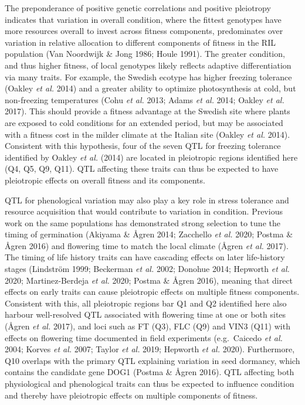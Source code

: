 \documentclass[
]{article}
\begin{document}
The preponderance of positive genetic correlations and positive pleiotropy indicates that variation in overall condition, where the fittest genotypes have more resources overall to invest across fitness components, predominates over variation in relative allocation to different components of fitness in the RIL population (Van Noordwijk \& Jong 1986; Houle 1991). The greater condition, and thus higher fitness, of local genotypes likely reflects adaptive differentiation via many traits. For example, the Swedish ecotype has higher freezing tolerance (Oakley \emph{et al.} 2014) and a greater ability to optimize photosynthesis at cold, but non-freezing temperatures (Cohu \emph{et al.} 2013; Adams \emph{et al.} 2014; Oakley \emph{et al.} 2017). This should provide a fitness advantage at the Swedish site where plants are exposed to cold conditions for an extended period, but may be associated with a fitness cost in the milder climate at the Italian site (Oakley \emph{et al.} 2014). Consistent with this hypothesis, four of the seven QTL for freezing tolerance identified by Oakley \emph{et al.} (2014) are located in pleiotropic regions identified here (Q4, Q5, Q9, Q11). QTL affecting these traits can thus be expected to have pleiotropic effects on overall fitness and its components.

QTL for phenological variation may also play a key role in stress tolerance and resource acquisition that would contribute to variation in condition. Previous work on the same populations has demonstrated strong selection to tune the timing of germination (Akiyama \& Ågren 2014; Zacchello \emph{et al.} 2020; Postma \& Ågren 2016) and flowering time to match the local climate (Ågren \emph{et al.} 2017). The timing of life history traits can have cascading effects on later life-history stages (Lindström 1999; Beckerman \emph{et al.} 2002; Donohue 2014; Hepworth \emph{et al.} 2020; Martinez-Berdeja \emph{et al.} 2020; Postma \& Ågren 2016), meaning that direct effects on early traits can cause pleiotropic effects on multiple fitness components. Consistent with this, all pleiotropic regions bar Q1 and Q2 identified here also harbour well-resolved QTL associated with flowering time at one or both sites (Ågren \emph{et al.} 2017), and loci such as FT (Q3), FLC (Q9) and VIN3 (Q11) with effects on flowering time documented in field experiments (e.g.~Caicedo \emph{et al.} 2004; Korves \emph{et al.} 2007; Taylor \emph{et al.} 2019; Hepworth \emph{et al.} 2020). Furthermore, Q10 overlaps with the primary QTL explaining variation in seed dormancy, which contains the candidate gene DOG1 (Postma \& Ågren 2016). QTL affecting both physiological and phenological traits can thus be expected to influence condition and thereby have pleiotropic effects on multiple components of fitness.
\end{document}
